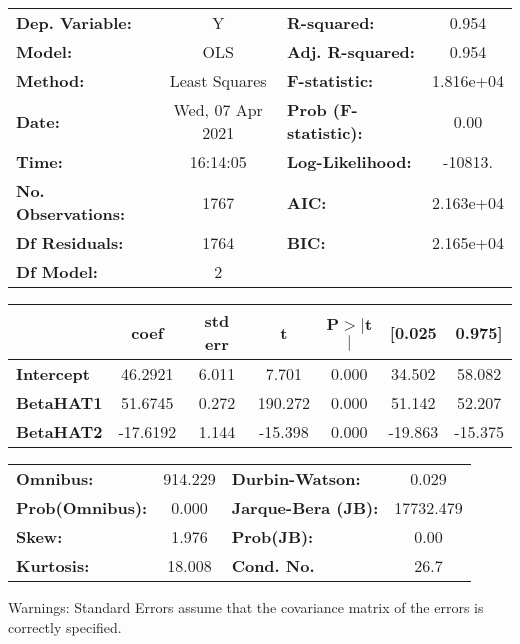 \documentclass{report}
\begin{document}
\begin{center}
\begin{tabular}{lclc}
\toprule
\textbf{Dep. Variable:}    &        Y         & \textbf{  R-squared:         } &     0.954   \\
\textbf{Model:}            &       OLS        & \textbf{  Adj. R-squared:    } &     0.954   \\
\textbf{Method:}           &  Least Squares   & \textbf{  F-statistic:       } & 1.816e+04   \\
\textbf{Date:}             & Wed, 07 Apr 2021 & \textbf{  Prob (F-statistic):} &     0.00    \\
\textbf{Time:}             &     16:14:05     & \textbf{  Log-Likelihood:    } &   -10813.   \\
\textbf{No. Observations:} &        1767      & \textbf{  AIC:               } & 2.163e+04   \\
\textbf{Df Residuals:}     &        1764      & \textbf{  BIC:               } & 2.165e+04   \\
\textbf{Df Model:}         &           2      & \textbf{                     } &             \\
\bottomrule
\end{tabular}
\begin{tabular}{lcccccc}
                   & \textbf{coef} & \textbf{std err} & \textbf{t} & \textbf{P$> |$t$|$} & \textbf{[0.025} & \textbf{0.975]}  \\
\midrule
\textbf{Intercept} &      46.2921  &        6.011     &     7.701  &         0.000        &       34.502    &       58.082     \\
\textbf{BetaHAT1}  &      51.6745  &        0.272     &   190.272  &         0.000        &       51.142    &       52.207     \\
\textbf{BetaHAT2}  &     -17.6192  &        1.144     &   -15.398  &         0.000        &      -19.863    &      -15.375     \\
\bottomrule
\end{tabular}
\begin{tabular}{lclc}
\textbf{Omnibus:}       & 914.229 & \textbf{  Durbin-Watson:     } &     0.029  \\
\textbf{Prob(Omnibus):} &   0.000 & \textbf{  Jarque-Bera (JB):  } & 17732.479  \\
\textbf{Skew:}          &   1.976 & \textbf{  Prob(JB):          } &      0.00  \\
\textbf{Kurtosis:}      &  18.008 & \textbf{  Cond. No.          } &      26.7  \\
\bottomrule
\end{tabular}
\end{center}

Warnings: \newline
 [1] Standard Errors assume that the covariance matrix of the errors is correctly specified.
\end{document}
